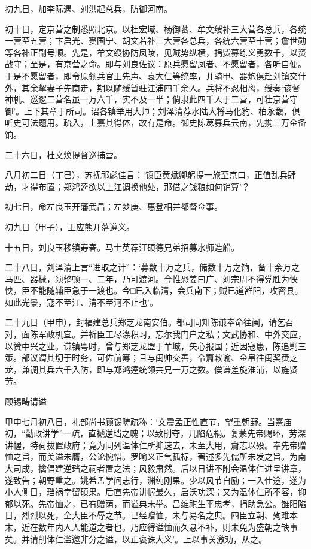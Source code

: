 \documentclass[]{article}
\begin{document}
初九日，加李际遇、刘洪起总兵，防御河南。

初十日，定京营之制悉照北京。以杜宏域、杨御蕃、牟文绶补三大营各总兵，各统一营至五营；卞启光、窦国宁、胡文若补三大营各总兵，各统六营至十营；詹世勋等各补正副号顺。先是，牟文绶协防凤陵，见贼势纵横，捐赀募练义勇数千，以资战守；至是，有京营之命。即与刘良佐议：原兵愿留凤者、不愿留者，各听自便。于是不愿留者，即令原领兵官王先声、袁大仁等统率，并骑甲、器炮俱赴刘镇交什外，其余挈妻子先南走，期以随绶暂驻江浦四千余人。兵将不忍相离，绶奏`该督神机、巡逻二营名虽一万六千，实不及一半；倘隶此四千人于二营，可壮京营守御'。上下其章于所司。诏各镇举用大帅；刘泽清荐水陆大将马化豹、柏永馥，俱听史可法题用。疏入，上嘉其得体，故有是命。御史陈荩募兵云南，先携三万金备饷。

二十六日，杜文焕提督巡捕营。

八月初二日（丁巳），苏抚祁彪佳言：`镇臣黄斌卿躬提一旅至京口，正值乱兵肆劫，才得布置；郑鸿逵欲以上江调换他处，那借之钱粮如何销算'？

初七日，命左良玉开藩武昌；左梦庚、惠登相并都督佥事。

初九日（甲子），王应熊开藩遵义。

十五日，刘良玉移镇寿春。马士英荐汪硕德兄弟招募水师造船。

二十八日，刘泽清上言``进取之计''：`募数十万之兵，储数十万之饷，备十余万之马匹、器械，须整顿一、二年，乃可渡河。今惟恐姜曰广、刘宗周不得党胜为怏怏，臣不能随辅臣急于一渡也。今□已入临清，会兵南下；贼已道雒阳，攻密县。如此光景，寇不至江、清不至河不止也'。

二十九日（甲申），封福建总兵郑芝龙南安伯。都司同知陈谦奉命往闽，请乞召对，面陈军政机宜。并祈臣工尽涤积习，忘尔我门户之私；文武协和、中外交应，以赞中兴之业。谦镇粤时，曾与郑芝龙盟于羊城，矢心报国；近因寇患，陈追剿三策。部议谓其切于时务，可佐前筹；且与闽帅交善，令齎敕谕、金帛往闽奖赉芝龙，兼调其兵六千入防，即与郑鸿逵统领共兄一万之数。俟谦差旋淮浦，以旌贤劳。

顾锡畴请谥

甲申七月初八日，礼部尚书顾锡畴疏称：`文震孟正性直节，望重朝野。当熹庙初，``勤政讲学''一疏，直褫逆珰之魄；以致削夺，几陷危祸。复蒙先帝赐环，劳深讲幄，特荷拔置政府；竟为同列温体仁所抑速去，未至大用，齎志以殁。奉先帝赠恤之旨，而美谥未膺，公论惋惜。罗喻义正气孤标，著述多先儒所未发之旨。为南大司成，擒倡建逆珰之祠者置之法；风毅肃然。后以日讲不附会温体仁进呈讲章，遂致告；朝野重之。姚希孟学问志行，渊纯刚果。少以风节自励；一入仕途，遂为小人侧目，珰祸幸留硕果。后直先帝讲幄最久，启沃功深；又为温体仁所不容，抑郁以死。先帝恤之，已有赠荫，而谥典未举。吕维祺生平忠孝，捐助急公。雒阳陷日，烈烈以死，全大臣不辱之节。已经赠恤，未与易名之典。四臣立朝、殉难本末，近在数年内人人能道之者也。乃应得谥恤而久悬不补，则未免为盛朝之缺事矣。并请削体仁滥邀非分之谥，以正褒诛大义'。上以事关激劝，从之。
\end{document}

